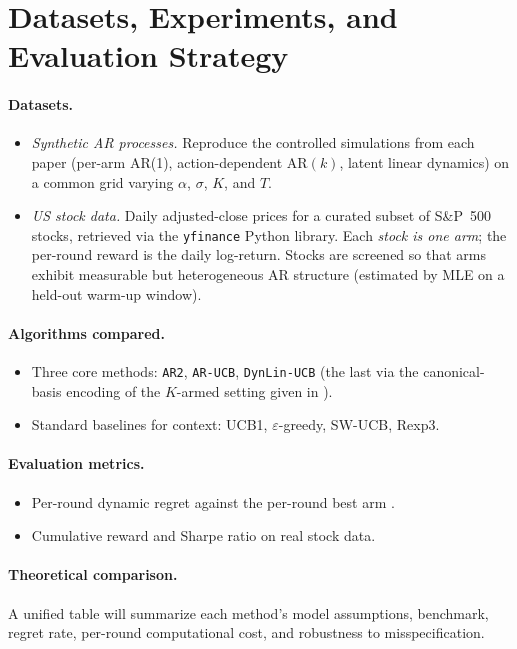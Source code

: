 \documentclass[11pt]{article}
\begin{document}
\section{Datasets, Experiments, and Evaluation Strategy}

\paragraph{Datasets.}
\begin{itemize}
  \item \emph{Synthetic AR processes.} Reproduce the controlled simulations from each paper (per-arm AR(1), action-dependent AR$(k)$, latent linear dynamics) on a common grid varying $\alpha$, $\sigma$, $K$, and $T$.
  \item \emph{US stock data.} Daily adjusted-close prices for a curated subset of S\&P~500 stocks, retrieved via the \texttt{yfinance} Python library. Each \emph{stock is one arm}; the per-round reward is the daily log-return. Stocks are screened so that arms exhibit measurable but heterogeneous AR structure (estimated by MLE on a held-out warm-up window).
\end{itemize}

\paragraph{Algorithms compared.}
\begin{itemize}
  \item Three core methods: \texttt{AR2}, \texttt{AR-UCB}, \texttt{DynLin-UCB} (the last via the canonical-basis encoding of the $K$-armed setting given in \citealp{mussi2023dlb}).
  \item Standard baselines for context: UCB1, $\varepsilon$-greedy, SW-UCB, Rexp3.
\end{itemize}

\paragraph{Evaluation metrics.}
\begin{itemize}
  \item Per-round dynamic regret against the per-round best arm \citep{chen2023ar2}.
  \item Cumulative reward and Sharpe ratio on real stock data.
\end{itemize}

\paragraph{Theoretical comparison.} A unified table will summarize each method's model assumptions, benchmark, regret rate, per-round computational cost, and robustness to misspecification.
\end{document}
